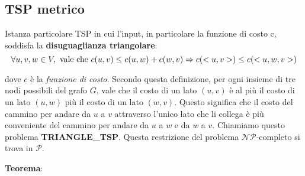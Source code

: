 \label{tsp_metrico}
\subsection{TSP metrico}

Istanza particolare TSP in cui l'input, in particolare la funzione di costo c, soddisfa la
\textbf{disuguaglianza triangolare}:
\[
\forall u, v, w \in V, \textnormal{ vale che } c(u, v) \le c(u, w) + c(w, v) \Rightarrow
c(<u, v>) \le c(<u, w, v>)
\]

dove $c$ è la \textit{funzione di costo}. Secondo questa definizione, per ogni insieme di tre nodi
possibili del grafo $G$, vale che il costo di un lato $(u, v)$ è al più il costo di un lato $(u, w)$
più il costo di un lato $(w, v)$. Questo significa che il costo del cammino per andare da $u$ a $v$
attraverso l'unico lato che li collega è più conveniente del cammino per andare da $u$ a $w$ e da
$w$ a $v$. Chiamiamo questo problema \textbf{TRIANGLE\_TSP}. Questa restrizione del problema
$\mathcal{NP}$-completo si trova in $\mathcal{P}$.

\textbf{Teorema}: 